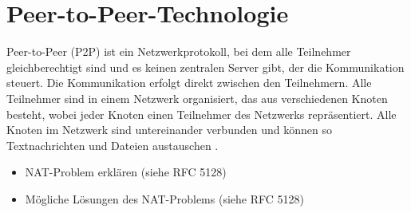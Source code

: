 \section{Peer-to-Peer-Technologie}


Peer-to-Peer (P2P) ist ein Netzwerkprotokoll, bei dem alle Teilnehmer gleichberechtigt sind und es 
keinen zentralen Server gibt, der die Kommunikation steuert. Die Kommunikation erfolgt direkt zwischen 
den Teilnehmern. Alle Teilnehmer sind in einem Netzwerk organisiert, das aus verschiedenen Knoten 
besteht, wobei jeder Knoten einen Teilnehmer des Netzwerks repräsentiert. Alle Knoten im Netzwerk 
sind untereinander verbunden und können so Textnachrichten und Dateien austauschen 
\parencite[\textcolor{red}{S. x-y}]{Mahlmann_P2PNetzwerke}.

\begin{itemize}
    \item NAT-Problem erklären (siehe RFC 5128)
    \item Mögliche Lösungen des NAT-Problems (siehe RFC 5128)
\end{itemize}